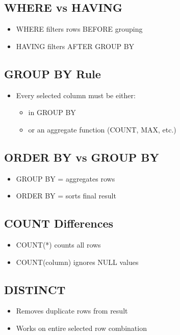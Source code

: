 \documentclass[10pt]{article}
\begin{document}
\subsection{WHERE vs HAVING}
\begin{itemize}
\item WHERE filters rows BEFORE grouping
\item HAVING filters AFTER GROUP BY
\end{itemize}

\subsection{GROUP BY Rule}
\begin{itemize}
\item Every selected column must be either:
    \begin{itemize}
    \item in GROUP BY
    \item or an aggregate function (COUNT, MAX, etc.)
    \end{itemize}
\end{itemize}

\subsection{ORDER BY vs GROUP BY}
\begin{itemize}
\item GROUP BY = aggregates rows
\item ORDER BY = sorts final result
\end{itemize}

\subsection{COUNT Differences}
\begin{itemize}
\item COUNT(*) counts all rows
\item COUNT(column) ignores NULL values
\end{itemize}

\subsection{DISTINCT}
\begin{itemize}
\item Removes duplicate rows from result
\item Works on entire selected row combination
\end{itemize}
\end{document}
